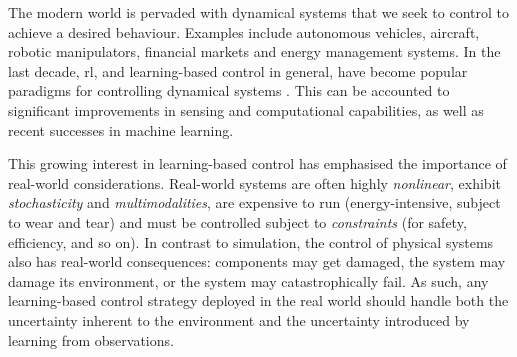 \documentclass{mimosis-class/mimosis}
\numberwithin{equation}{chapter}
\newcommand{\modeInd}{\ensuremath{k}}
\newcommand{\state}{\ensuremath{\mathbf{x}}}
\newcommand{\control}{\ensuremath{\mathbf{u}}}
\newcommand{\modeVar}{\ensuremath{\alpha}}
\begin{document}
\newcommand{\stateDiff}{\ensuremath{\Delta \state}}

\renewcommand{\stateCostMatrix}{\ensuremath{\mathbf{Q}}}
\renewcommand{\controlCostMatrix}{\ensuremath{\mathbf{R}}}
\renewcommand{\terminalStateCostMatrix}{\ensuremath{\mathbf{H}}}
\renewcommand{\approxExpectedCost}{\ensuremath{J(\stateTraj, \controlTraj)}}

\renewcommand{\terminalState}{\ensuremath{\state_{\TimeInd}}}

\newcommand{\stateMean}{\ensuremath{\bm\mu_{\state_\timeInd}}}
\newcommand{\stateCov}{\ensuremath{\bm\Sigma_{\state_\timeInd}}}
\newcommand{\terminalStateMean}{\ensuremath{\bm\mu_{\state_\TimeInd}}}
\newcommand{\terminalStateCov}{\ensuremath{\bm\Sigma_{\state_\TimeInd}}}
\newcommand{\controlMean}{\ensuremath{\bm\mu_{\control_\timeInd}}}
\newcommand{\controlCov}{\ensuremath{\bm\Sigma_{\control_\timeInd}}}
\newcommand{\stateDiff}{\ensuremath{\Delta \state}}
\newcommand{\stateDiffMean}{\ensuremath{\bm\mu_{\stateDiff_\timeInd}}}
\newcommand{\stateDiffCov}{\ensuremath{\bm\Sigma_{\stateDiff_\timeInd}}}

\renewcommand{\transitionDistK}{\ensuremath{p(\state_{\timeInd+1} \mid \state_\timeInd, \control_\timeInd, \modeVar_{\timeInd}=\modeInd)}}
The modern world is pervaded with dynamical systems that we seek to control to achieve a desired behaviour.
Examples include autonomous vehicles, aircraft, robotic manipulators, financial markets and energy management systems.
In the last decade, \acrfull{rl}, and learning-based
control in general, have become
popular paradigms for controlling dynamical systems \citep{hewingLearningBased2020,sutton2018reinforcement}.
This can be accounted to significant improvements in sensing and computational capabilities, as well as
recent successes in machine learning.

This growing interest in learning-based control
has emphasised the importance of real-world considerations.
Real-world systems are often highly \emph{nonlinear}, exhibit \emph{stochasticity} and \emph{multimodalities},
are expensive to run (energy-intensive, subject to wear and tear) and
must be controlled subject to \emph{constraints} (for safety, efficiency, and so on).
In contrast to simulation, the control of physical systems also has real-world consequences:
components may get damaged, the system may damage its environment, or the system may catastrophically fail.
As such, any learning-based control strategy deployed in the real world should handle both the uncertainty inherent
to the environment and the uncertainty introduced by learning from observations.
\end{document}
